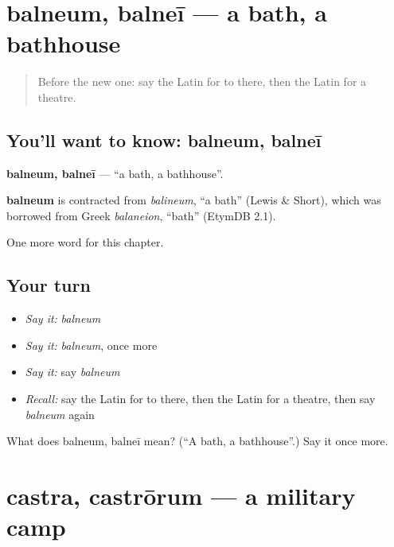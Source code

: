 \section[balneum, balneī]{balneum, balneī — a bath, a bathhouse}

\label{lesson:LA-C115-balneum}



\begin{quote}
Before the new one: say the Latin for to there, then the Latin for a theatre.
\end{quote}

\subsection*{You'll want to know: balneum, balneī}
\textbf{balneum, balneī} — \textquotedblleft{}a bath, a bathhouse\textquotedblright{}.

\begin{cousinweb}
\textbf{balneum} is contracted from \emph{balineum}, \textquotedblleft{}a bath\textquotedblright{} (Lewis \& Short), which was borrowed from Greek \emph{balaneion}, \textquotedblleft{}bath\textquotedblright{} (EtymDB 2.1).
\end{cousinweb}

\begin{grammarlens}[title={What you've built}]
One more word for this chapter.
\end{grammarlens}

\subsection*{Your turn}
\begin{itemize}
\raggedright
  \item \emph{Say it:} \emph{balneum}
  \item \emph{Say it:} \emph{balneum}, once more
  \item \emph{Say it:} say \emph{balneum}
  \item \emph{Recall:} say the Latin for to there, then the Latin for a theatre, then say \emph{balneum} again
\end{itemize}

\begin{tcolorbox}[breakable,colback=teal!4,colframe=teal!35!black,title={Before you move on}]
What does balneum, balneī mean? (\textquotedblleft{}A bath, a bathhouse\textquotedblright{}.) Say it once more.
\end{tcolorbox}
\section[castra, castrōrum]{castra, castrōrum — a military camp}

